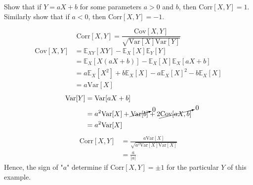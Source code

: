 \begin{example}
	Show that if $Y=aX+b$ for some parameters $a>0$ and $b$, then $\text{Corr}[X,Y]=1$. Similarly show that if $a<0$, then $\text{Corr}[X,Y]=-1$.
	
	\begin{equation}
		\text{Corr}[X,Y] = \frac{\text{Cov}[X,Y]}{\sqrt{\text{Var}[X]\text{Var}[Y]}}
	\end{equation}
	\begin{equation}
		\begin{split}
			\text{Cov}[X,Y] & = \mathbb{E}_{XY}[XY]-\mathbb{E}_X[X]\mathbb{E}_Y[Y]\\
			&= \mathbb{E}_X[X(aX+b)]-\mathbb{E}_X[X]\mathbb{E}_X[aX+b]\\
			&= a\mathbb{E}_X[X^2]+b\mathbb{E}_X[X]-a\mathbb{E}_X[X]^2-b\mathbb{E}_X[X]\\
			&=a\text{Var}[X]
		\end{split}
	\end{equation}
	\begin{equation}
		\begin{split}
			\text{Var}[Y] &= \text{Var}[aX+b]\\
			&= a^2\text{Var}[X]+\cancelto{0}{\text{Var}[b]}+2\cancelto{0}{\text{Cov}[aX,b]}\\
			& = a^2\text{Var}[X]
		\end{split}
	\end{equation}
	\begin{equation}
		\begin{split}
			\text{Corr}[X,Y] &= \frac{a\text{Var}[X]}{\sqrt{a^2\text{Var}[X]\text{Var}[X]}}\\
			&=\frac{a}{|a|}		
		\end{split}
	\end{equation}
	Hence, the sign of "$a$" determine if $\text{Corr}[X,Y]=\pm 1$ for the particular $Y$ of this example.
\end{example}